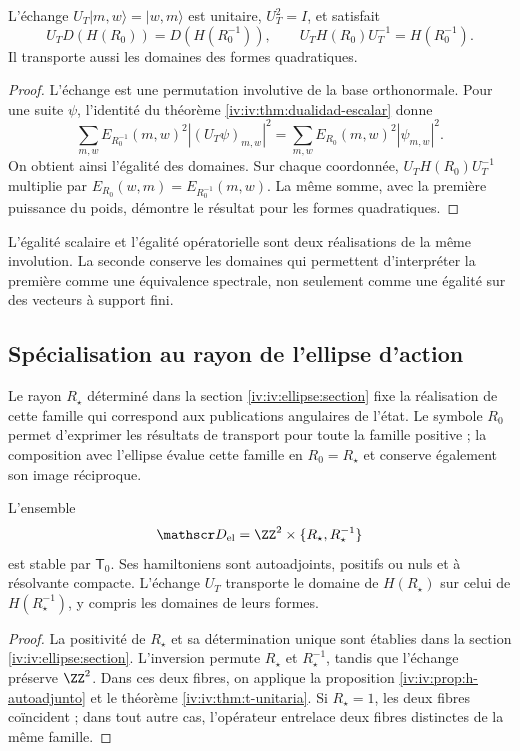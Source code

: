 \begin{theorem}
\label{iv:iv:thm:t-unitaria}
\label{iv:prop:dualidad-radios-k}
L’échange
\(U_T|m,w\rangle=|w,m\rangle\) est unitaire,
\(U_T^2=I\), et satisfait
\begin{equation}
 U_TD(H(R_0))=D(H(R_0^{-1})),
 \qquad U_TH(R_0)U_T^{-1}=H(R_0^{-1}).
 \label{iv:iv:eq:conjugacion-h}
\end{equation}
Il transporte aussi les domaines des formes quadratiques.
\end{theorem}
\begin{proof}
L’échange est une permutation involutive de la base
orthonormale. Pour une suite \(\psi\), l’identité du
théorème \ref{iv:iv:thm:dualidad-escalar} donne
\[
 \sum_{m,w}E_{R_0^{-1}}(m,w)^2|(U_T\psi)_{m,w}|^2
 =\sum_{m,w}E_{R_0}(m,w)^2|\psi_{m,w}|^2.
\]
On obtient ainsi l’égalité des domaines. Sur chaque coordonnée,
\(U_TH(R_0)U_T^{-1}\) multiplie par
\(E_{R_0}(w,m)=E_{R_0^{-1}}(m,w)\). La même somme, avec
la première puissance du poids, démontre le résultat pour les
formes quadratiques.
\end{proof}

L’égalité scalaire et l’égalité opératorielle sont deux réalisations
de la même involution. La seconde conserve les domaines qui
permettent d’interpréter la première comme une équivalence spectrale,
non seulement comme une égalité sur des vecteurs à support fini.

\subsection{Spécialisation au rayon de l’ellipse d’action}

Le rayon \(R_\star\) déterminé dans la section
\ref{iv:iv:ellipse:section} fixe la réalisation de cette famille qui
correspond aux publications angulaires de l’état. Le symbole
\(R_0\) permet d’exprimer les résultats de transport pour toute la
famille positive ; la composition avec l’ellipse évalue cette famille en
\(R_0=R_\star\) et conserve également son image réciproque.

\begin{corollary}
\label{iv:iv:cor:radio-especializado}
L'ensemble
\[
 \mathscr D_{\mathrm{el}}
 =\ZZ^2\times\{R_\star,R_\star^{-1}\}
\]
est stable par \(\mathsf T_0\). Ses hamiltoniens sont autoadjoints,
positifs ou nuls et à résolvante compacte. L’échange \(U_T\)
transporte le domaine de \(H(R_\star)\) sur celui de
\(H(R_\star^{-1})\), y compris les domaines de leurs formes.
\end{corollary}
\begin{proof}
La positivité de \(R_\star\) et sa détermination unique sont établies
dans la section \ref{iv:iv:ellipse:section}. L’inversion permute
\(R_\star\) et \(R_\star^{-1}\), tandis que l’échange préserve
\(\ZZ^2\). Dans ces deux fibres, on applique la proposition
\ref{iv:iv:prop:h-autoadjunto} et le théorème \ref{iv:iv:thm:t-unitaria}.
Si \(R_\star=1\), les deux fibres coïncident ; dans tout autre cas,
l’opérateur entrelace deux fibres distinctes de la même famille.
\end{proof}

